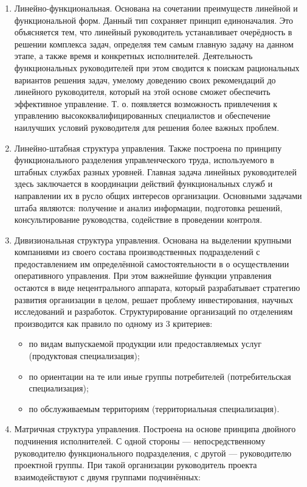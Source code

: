 \documentclass[12pt, russian, oneside, article]{ncc}
\begin{document}
\begin{enumerate}
\item Линейно-функциональная. Основана на сочетании преимуществ линейной и функциональной форм. Данный тип сохраняет принцип единоначалия. Это объясняется тем, что линейный руководитель устанавливает очерёдность в решении комплекса задач, определяя тем самым главную задачу на данном этапе, а также время и конкретных исполнителей. Деятельность функциональных руководителей при этом сводится к поискам рациональных вариантов решения задач, умелому доведению своих рекомендаций до линейного руководителя, который на этой основе сможет обеспечить эффективное управление. Т. о. появляется возможность привлечения к управлению высококвалифицированных специалистов и обеспечение наилучших условий руководителя для решения более важных проблем.
\item Линейно-штабная структура управления. Также построена по принципу функционального разделения управленческого труда, используемого в штабных службах разных уровней. Главная задача линейных руководителей здесь заключается в координации действий функциональных служб и направлении их в русло общих интересов организации. Основными задачами штаба являются: получение и анализ информации, подготовка решений, консультирование руководства, содействие в проведении контроля.
\item Дивизиональная структура управления. Основана на выделении крупными компаниями из своего состава производственных подразделений с предоставлением им определённой самостоятельности в о осуществлении оперативного управления. При этом важнейшие функции управления остаются в виде нецентрального аппарата, который разрабатывает стратегию развития организации в целом, решает проблему инвестирования, научных исследований и разработок. Структурирование организаций по отделениям производится как правило по одному из 3 критериев:

\begin{itemize}
\item по видам выпускаемой продукции или предоставляемых услуг (продуктовая специализация);
\item по ориентации на те или иные группы потребителей (потребительская специализация);
\item по обслуживаемым территориям (территориальная специализация).
\end{itemize}

\item Матричная структура управления. Построена на основе принципа двойного подчинения исполнителей. С одной стороны --- непосредственному руководителю функционального подразделения, с другой --- руководителю проектной группы. При такой организации руководитель проекта взаимодействуют с двумя группами подчинённых:


\end{enumerate}
\end{document}
